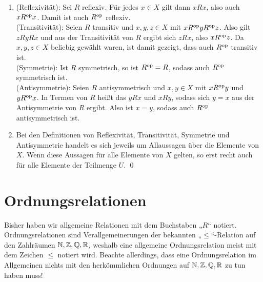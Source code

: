 \begin{bew} \quad
    \begin{enumerate}
    \item (Reflexivität): Sei $R$ reflexiv. Für jedes $x\in X$ gilt dann  $xRx$, also auch $xR^{\mathrm{op}} x$. Damit ist auch $R^{\mathrm{op}}$ reflexiv. \\[0.5em]
    (Transitivität): Seien $R$ transitiv und $x,y,z\in X$ mit $xR^{\mathrm{op}} yR^{\mathrm{op}} z$. Also gilt $zRyRx$ und aus der Transitivität von $R$ ergibt sich $zRx$, also $xR^{\mathrm{op}} z$. Da $x,y,z\in X$ beliebig gewählt waren, ist damit gezeigt, dass auch $R^{\mathrm{op}}$ transitiv ist. \\[0.5em]
    (Symmetrie): Ist $R$ symmetrisch, so ist $R^{\mathrm{op}}=R$, sodass auch $R^{\mathrm{op}}$ symmetrisch ist. \\[0.5em]
    (Antisymmetrie): Seien $R$ antisymmetrisch und $x,y\in X$ mit $x R^{\mathrm{op}} y$ und $y R^{\mathrm{op}} x$. In Termen von $R$ heißt das $y Rx$ und $x Ry$, sodass sich $y=x$ aus der Antisymmetrie von $R$ ergibt. Also ist $x=y$, sodass auch $R^{\mathrm{op}}$ antisymmetrisch ist.
    \item Bei den Definitionen von Reflexivität, Transitivität, Symmetrie und Antisymmetrie handelt es sich jeweils um Allaussagen über die Elemente von $X$. Wenn diese Aussagen für alle Elemente von $X$ gelten, so erst recht auch für alle Elemente der Teilmenge $U$. \qed
    \end{enumerate}
\end{bew}





\section{Ordnungsrelationen}


\begin{nota}
    Bisher haben wir allgemeine Relationen mit dem Buchstaben „$R$“ notiert. Ordnungsrelationen sind Verallgemeinerungen der bekannten „$\le$“-Relation auf den Zahlräumen $\mathbb N,\mathbb Z,\mathbb Q,\mathbb R$, weshalb eine allgemeine Ordnungsrelation meist mit dem Zeichen $\le$ notiert wird. Beachte allerdings, dass eine Ordnungsrelation im Allgemeinen nichts mit den herkömmlichen Ordnungen auf $\mathbb N,\mathbb Z,\mathbb Q,\mathbb R$ zu tun haben muss!
\end{nota}



